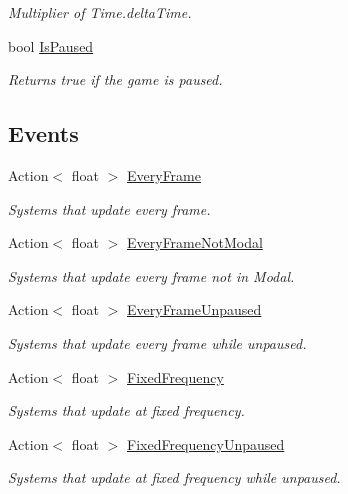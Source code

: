\begin{DoxyCompactItemize}
\begin{DoxyCompactList}\small\item\em Multiplier of Time.\+delta\+Time. \end{DoxyCompactList}\item 
bool \hyperlink{class_time_manager_af2072e9048d854f66fc5b7eb48d3c4af}{Is\+Paused}
\begin{DoxyCompactList}\small\item\em Returns true if the game is paused. \end{DoxyCompactList}\end{DoxyCompactItemize}
\subsection*{Events}
\begin{DoxyCompactItemize}
\item 
Action$<$ float $>$ \hyperlink{class_time_manager_aab532df265c6f480671cdab70bed571b}{Every\+Frame}
\begin{DoxyCompactList}\small\item\em Systems that update every frame. \end{DoxyCompactList}\item 
Action$<$ float $>$ \hyperlink{class_time_manager_a084a70cfad60b39d423fe1113ae3f62f}{Every\+Frame\+Not\+Modal}
\begin{DoxyCompactList}\small\item\em Systems that update every frame not in Modal. \end{DoxyCompactList}\item 
Action$<$ float $>$ \hyperlink{class_time_manager_ab7ecb89b1c903096f6b95b031e8b4b98}{Every\+Frame\+Unpaused}
\begin{DoxyCompactList}\small\item\em Systems that update every frame while unpaused. \end{DoxyCompactList}\item 
Action$<$ float $>$ \hyperlink{class_time_manager_aeebfc9883aff231dfd13abc52f1510c6}{Fixed\+Frequency}
\begin{DoxyCompactList}\small\item\em Systems that update at fixed frequency. \end{DoxyCompactList}\item 
Action$<$ float $>$ \hyperlink{class_time_manager_a6409743a5b7413daae38d535063dc29d}{Fixed\+Frequency\+Unpaused}
\begin{DoxyCompactList}\small\item\em Systems that update at fixed frequency while unpaused. \end{DoxyCompactList}\end{DoxyCompactItemize}


